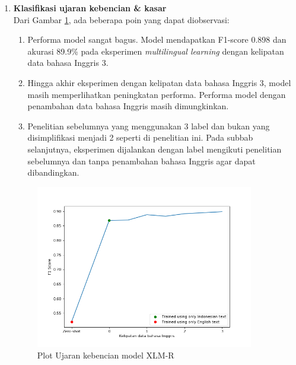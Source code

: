 \begin{enumerate}
         
            \item \textbf{Klasifikasi ujaran kebencian \& kasar} \\
            Dari Gambar \ref{fig:plot_full_toxic_xlmr}, ada beberapa poin yang dapat diobservasi:
            \begin{enumerate}
                \item Performa model sangat bagus. Model mendapatkan F1-score 0.898 dan akurasi 89.9\% pada eksperimen \textit{multilingual learning} dengan kelipatan data bahasa Inggris 3.
                \item Hingga akhir eksperimen dengan kelipatan data bahasa Inggris 3, model masih memperlihatkan peningkatan performa. Performa model dengan penambahan data bahasa Inggris masih dimungkinkan.
                \item  Penelitian sebelumnya yang menggunakan 3 label dan bukan yang disimplifikasi menjadi 2 seperti di penelitian ini. Pada subbab selanjutnya, eksperimen dijalankan dengan label mengikuti penelitian sebelumnya dan tanpa penambahan bahasa Inggris agar dapat dibandingkan.
            \end{enumerate} 

            \begin{figure}[htb]
                \centering
                \includegraphics[width=0.9\textwidth]{resources/plot-full-toxic-xlmr.png}
                \caption{Plot Ujaran kebencian model XLM-R}
                \label{fig:plot_full_toxic_xlmr}
            \end{figure}

        \end{enumerate}

